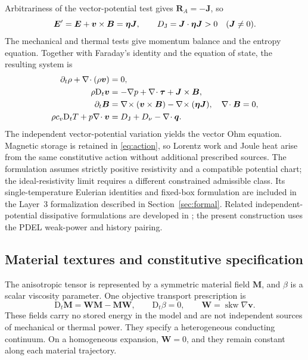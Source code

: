 \documentclass[11pt,a4paper]{article}
\theoremstyle{remark}\newtheorem{remark}{Remark}
\numberwithin{equation}{section}
\newcommand{\vv}{\boldsymbol v}
\newcommand{\BB}{\boldsymbol B}
\newcommand{\JJ}{\boldsymbol J}
\newcommand{\EE}{\boldsymbol E}
\newcommand{\MM}{\boldsymbol M}
\newcommand{\ttau}{\boldsymbol\tau}
\newcommand{\etab}{\boldsymbol\eta}
\newcommand{\qv}{\boldsymbol q}
\newcommand{\grad}{\nabla}
\newcommand{\diver}{\nabla\!\cdot}
\newcommand{\curl}{\nabla\!\times}
\newcommand{\Dt}{\mathrm D_t}
\newcommand{\skw}{\operatorname{skw}}
\begin{document}
Arbitrariness of the vector-potential test gives $\boldsymbol R_A=-\JJ$, so
\begin{equation}
\EE'=\EE+\vv\times\BB=\etab\JJ,
\qquad D_{\rm J}=\JJ\cdot\etab\JJ>0\quad(\JJ\ne0).
\label{eq:ohm}
\end{equation}
The mechanical and thermal tests give momentum balance and the entropy equation. Together with Faraday's identity and the equation of state, the resulting system is
\begin{subequations}\label{eq:system}
\begin{align}
\partial_t\rho+\diver(\rho\vv)&=0,\label{eq:mass}\\
\rho\Dt\vv&=-\grad p+\diver\ttau+\JJ\times\BB,\label{eq:mom}\\
\partial_t\BB&=\curl(\vv\times\BB)-\curl(\etab\JJ),
\quad\diver\BB=0,\label{eq:induction}\\
\rho c_v\Dt T+p\diver\vv&=D_{\rm J}+D_\nu-\diver\qv.
\label{eq:heat}
\end{align}
\end{subequations}
The independent vector-potential variation yields the vector Ohm equation. Magnetic storage is retained in \eqref{eq:action}, so Lorentz work and Joule heat arise from the same constitutive action without additional prescribed sources. The formulation assumes strictly positive resistivity and a compatible potential chart; the ideal-resistivity limit requires a different constrained admissible class. Its single-temperature Eulerian identities and fixed-box formulation are included in the Layer~3 formalization described in Section~\ref{sec:formal}. Related independent-potential dissipative formulations are developed in \citet{Carlier}; the present construction uses the PDEL weak-power and history pairing.

\subsection{Material textures and constitutive specification}
The anisotropic tensor is represented by a symmetric material field $\MM$, and $\beta$ is a scalar viscosity parameter. One objective transport prescription is
\begin{equation}
\Dt\MM=\boldsymbol W\MM-\MM\boldsymbol W,\qquad
\Dt\beta=0,\qquad \boldsymbol W=\skw\grad\vv.
\label{eq:textures}
\end{equation}
These fields carry no stored energy in the model and are not independent sources of mechanical or thermal power. They specify a heterogeneous conducting continuum. On a homogeneous expansion, $\boldsymbol W=0$, and they remain constant along each material trajectory.
\end{document}
